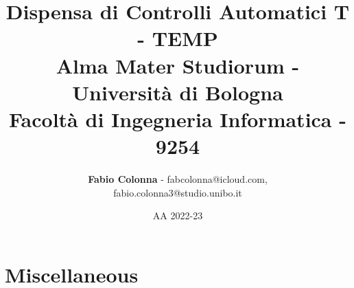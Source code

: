 \documentclass[a4paper]{report}
\title{
    \textbf{Dispensa di Controlli Automatici T - TEMP} \\
       \large Alma Mater Studiorum - Università di Bologna \\
    \large Facoltà di Ingegneria Informatica - 9254
}
\author{\textbf{Fabio Colonna} - fabcolonna@icloud.com, \\
        fabio.colonna3@studio.unibo.it }
\date{AA 2022-23}
\begin{document}
\maketitle
\tableofcontents
\newpage

\part{Miscellaneous}
\end{document}

